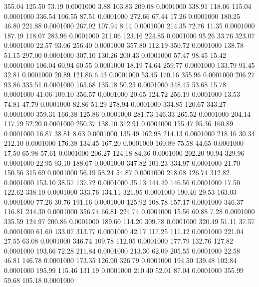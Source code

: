  355.04  125.50   73.19   0.0001000
   3.88  103.83  209.08   0.0001000
 338.91  118.06  115.04   0.0001000
 336.54  106.55   87.51   0.0001000
 272.66   67.44   17.26   0.0001000
 180.25   46.80  221.88   0.0001000
 267.92  107.94    8.14   0.0001000
 214.35   72.76   11.35   0.0001000
 187.19  118.07  283.96   0.0001000
 211.06  123.16  224.85   0.0001000
  95.26   33.76  323.07   0.0001000
  22.57   93.06  256.40   0.0001000
 357.80  112.19  350.72   0.0001000
 138.78   51.15  297.00   0.0001000
 307.10  130.26  200.43   0.0001000
  57.47   98.45   15.42   0.0001000
 106.04   60.94   60.55   0.0001000
  18.19   74.64  259.77   0.0001000
 133.79   91.45   32.81   0.0001000
  20.89  121.86    6.43   0.0001000
  53.45  170.16  355.96   0.0001000
 206.27   93.86  335.51   0.0001000
 165.68  135.18   50.25   0.0001000
 348.45   53.68   15.78   0.0001000
  41.06  109.10  356.57   0.0001000
  20.65  124.72  256.19   0.0001000
  13.53   74.81   47.79   0.0001000
  82.86   51.29  278.94   0.0001000
 334.85  120.67  343.27   0.0001000
 359.31  166.38  125.86   0.0001000
 281.73  146.33  265.52   0.0001000
 204.14  117.79   52.20   0.0001000
 250.37  138.10  312.91   0.0001000
 155.47   95.36  160.89   0.0001000
  16.87   38.81    8.63   0.0001000
 135.49  162.98  214.13   0.0001000
 218.16   30.34  212.10   0.0001000
 176.38  134.45  167.20   0.0001000
 160.89   75.58   44.65   0.0001000
  17.50   65.98   57.61   0.0001000
 206.27  124.18   84.36   0.0001000
 202.20   90.94  329.96   0.0001000
  22.95   93.10  188.67   0.0001000
 347.82  101.23  334.97   0.0001000
  21.70  150.56  315.69   0.0001000
  56.19   58.24   54.87   0.0001000
 218.08  126.74  312.82   0.0001000
 153.10   38.57  137.72   0.0001000
  35.13  144.49  146.56   0.0001000
  17.50  122.62  338.10   0.0001000
 333.76  134.11  321.95   0.0001000
 190.40   29.53  163.03   0.0001000
  77.26   30.76  191.16   0.0001000
 125.92  108.78  157.17   0.0001000
 346.37  116.81  244.30   0.0001000
 356.74   66.81  224.74   0.0001000
  15.56   60.88    7.28   0.0001000
 335.59  124.97  200.86   0.0001000
 189.60  114.20  309.78   0.0001000
 320.49   51.11   37.57   0.0001000
  61.60  133.07  313.77   0.0001000
  42.17  117.25  111.12   0.0001000
 221.04   27.55   63.08   0.0001000
 346.74  109.78  112.05   0.0001000
 177.79  132.76  127.82   0.0001000
 193.66   72.28  211.84   0.0001000
 213.30   62.09  205.55   0.0001000
  22.58   46.81  146.78   0.0001000
 173.35  126.90  326.79   0.0001000
 194.50  139.48  102.84   0.0001000
 195.99  115.46  131.19   0.0001000
 210.40   52.01   87.04   0.0001000
 355.99   59.68  105.18   0.0001000
